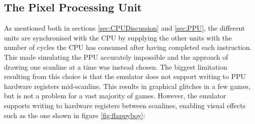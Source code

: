 \subsection{The Pixel Processing Unit}
As mentioned both in sections \ref{sec:CPUDiscussion} and \ref{sec:PPU}, the different units are synchronised with the CPU by supplying the other units with the number of cycles the CPU has consumed after having completed each instruction. This made simulating the PPU accurately impossible and the approach of drawing one scanline at a time was instead chosen. The biggest limitation resulting from this choice is that the emulator does not support writing to PPU hardware registers mid-scanline. This results in graphical glitches in a few games, but is not a problem for a vast majority of games. However, the emulator supports writing to hardware registers between scanlines, enabling visual effects such as the one shown in figure \ref{fig:flappyboy}:


